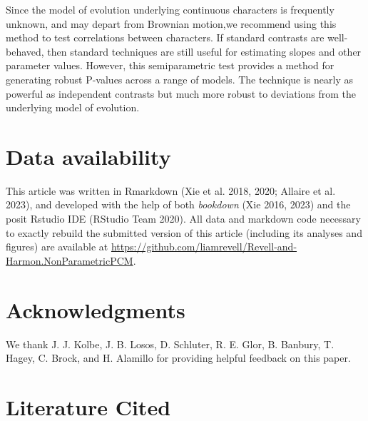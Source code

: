 \documentclass[fleqn,10pt,lineno]{wlpeerj} %
\begin{document}
Since the model of evolution underlying continuous characters is frequently unknown, and may depart from Brownian motion,we recommend using this method to test correlations between characters. If standard contrasts are well-behaved, then standard techniques are still useful for estimating slopes and other parameter values. However, this semiparametric test provides a method for generating robust P-values across a range of models. The technique is nearly as powerful as independent contrasts but much more robust to deviations from the underlying model of evolution.

\section{Data availability}\label{data-availability}

This article was written in Rmarkdown (Xie et al. 2018, 2020; Allaire et al. 2023), and developed with the help of both \emph{bookdown} (Xie 2016, 2023) and the posit Rstudio IDE (RStudio Team 2020). All data and markdown code necessary to exactly rebuild the submitted version of this article (including its analyses and figures) are available at \url{https://github.com/liamrevell/Revell-and-Harmon.NonParametricPCM}.

\section{Acknowledgments}\label{acknowledgments}

We thank J. J. Kolbe, J. B. Losos, D. Schluter, R. E. Glor, B. Banbury, T. Hagey, C. Brock, and H. Alamillo for providing helpful feedback on this paper.

\section*{Literature Cited}\label{literature-cited}
\end{document}
